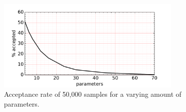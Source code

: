 \begin{figure}
	\centering
	\includegraphics[width=0.8\textwidth]{simple-linear-system/figures/higher_dim/acceptance_rate}
	\caption{Acceptance rate of 50,000 samples for a varying amount of parameters.}
	\label{fig:linear_system.high_dim.acceptance}
\end{figure}


































